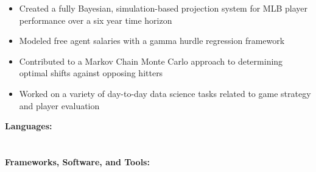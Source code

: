 \documentclass[10pt,a4paper,ragged2e,withhyper]{/Users/matt/documents/GitHub/mrkaye97.github.io/resume/altacv}
\begin{document}
\begin{paracol}{2}
		\divider

		\begin{itemize}
		\item Created a fully Bayesian, simulation-based projection system for MLB player performance over a six year time horizon
		\item Modeled free agent salaries with a gamma hurdle regression framework
		\item Contributed to a Markov Chain Monte Carlo approach to determining optimal shifts against opposing hitters
		\item Worked on a variety of day-to-day data science tasks related to game strategy and player evaluation
		\end{itemize}

		
%		
%		
%		
%		
		
		\switchcolumn
		\smallskip
		\textbf{Languages:}\\
		\smallskip
		\\
		
		
		\divider\smallskip\\
		\textbf{Frameworks, Software, and Tools:}\\
		\smallskip\\
		\smallskip\\
		
		 \\
		 \\
		 \\
		\\
		

\end{paracol}
\end{document}
